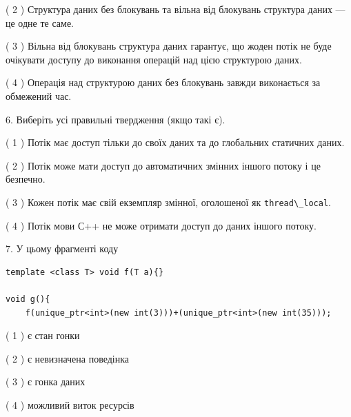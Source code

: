 \documentclass[12pt, ukrainian]{article}
\def\code#1{\Verb!#1!}
\begin{document}
\begin {large}
{( 2 ) Структура даних без блокувань та вільна від блокувань структура даних --- це одне те саме.%

( 3 ) Вільна від блокувань структура даних гарантує, що жоден потік не буде очікувати доступу до виконання операцій над цією структурою даних.%

( 4 ) Операція над структурою даних без блокувань завжди виконається за обмежений час.%
\newpage



\vspace{5mm}
6. Виберіть усі правильні твердження (якщо такі є).\par
\vspace{2mm}

( 1 ) Потік має доступ тільки до своїх даних та до глобальних статичних даних.%

( 2 ) Потік може мати доступ до автоматичних змінних іншого потоку і це безпечно.%

( 3 ) Кожен потік має свій екземпляр змінної, оголошеної як \code{thread\_local}.%

( 4 ) Потік мови С++ не може отримати доступ до даних іншого потоку.%


\vspace{5mm}
7. У цьому фрагменті коду
\begin{verbatim}
template <class T> void f(T a){}

void g(){
    f(unique_ptr<int>(new int(3)))+(unique_ptr<int>(new int(35)));
\end{verbatim}

( 1 ) є стан гонки%

( 2 ) є невизначена поведінка%

( 3 ) є гонка даних%

( 4 ) можливий виток ресурсів%
}
\end {large}
\end{document}
